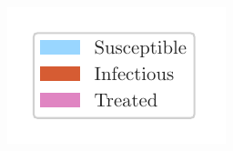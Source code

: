   \begin{minipage}[t]{2.6cm}\vspace{1.1cm}
    \includegraphics[width=\linewidth]{flows-legend-v.pdf}
  \end{minipage}
